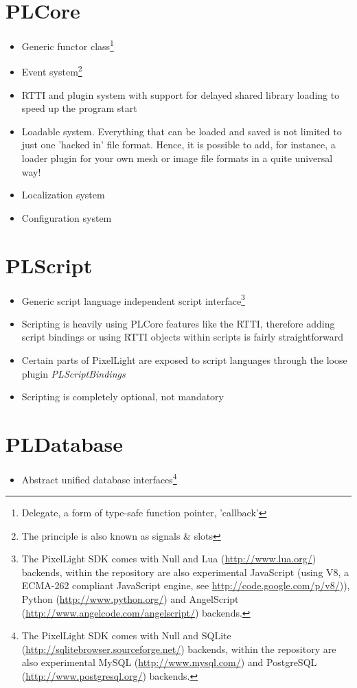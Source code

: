 \section{PLCore}
\begin{itemize}
\item{Generic functor class\footnote{Delegate, a form of type-safe function pointer, 'callback'}}
\item{Event system\footnote{The principle is also known as signals \& slots}}
\item{RTTI and plugin system with support for delayed shared library loading to speed up the program start}
\item{Loadable system. Everything that can be loaded and saved is not limited to just one 'hacked in' file format. Hence, it is possible to add, for instance, a loader plugin for your own mesh or image file formats in a quite universal way!}
\item{Localization system}
\item{Configuration system}
\end{itemize}




\section{PLScript}
\begin{itemize}
\item{Generic script language independent script interface\footnote{The PixelLight SDK comes with Null and Lua (\url{http://www.lua.org/}) backends, within the repository are also experimental JavaScript (using V8, a ECMA-262 compliant JavaScript engine, see \url{http://code.google.com/p/v8/})), Python (\url{http://www.python.org/}) and AngelScript (\url{http://www.angelcode.com/angelscript/}) backends.}}
\item{Scripting is heavily using PLCore features like the RTTI, therefore adding script bindings or using RTTI objects within scripts is fairly straightforward}
\item{Certain parts of PixelLight are exposed to script languages through the loose plugin \emph{PLScriptBindings}}
\item{Scripting is completely optional, not mandatory}
\end{itemize}




\section{PLDatabase}
\begin{itemize}
\item{Abstract unified database interfaces\footnote{The PixelLight SDK comes with Null and SQLite (\url{http://sqlitebrowser.sourceforge.net/}) backends, within the repository are also experimental MySQL (\url{http://www.mysql.com/}) and PostgreSQL (\url{http://www.postgresql.org/}) backends.}}
\end{itemize}




